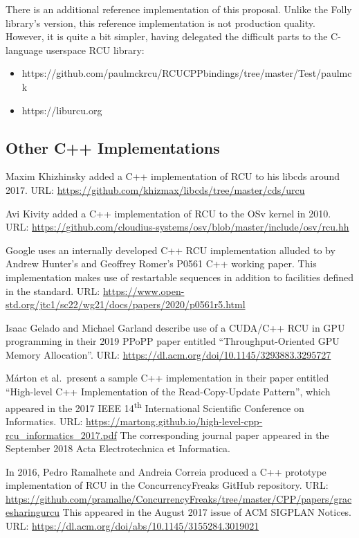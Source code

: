 There is an additional reference implementation of this proposal.
Unlike the Folly library's version, this reference implementation is
not production quality.
However, it is quite a bit simpler, having delegated the difficult parts
to the C-language userspace RCU library:

\begin{itemize}
\item	https://github.com/paulmckrcu/RCUCPPbindings/tree/master/Test/paulmck
\item	https://liburcu.org
\end{itemize}

\subsection{Other C++ Implementations}
\label{sec:Other C++ Implementations}

Maxim Khizhinsky added a C++ implementation of RCU to his libcds
around 2017.
URL: \url{https://github.com/khizmax/libcds/tree/master/cds/urcu}

Avi Kivity added a C++ implementation of RCU to the OSv kernel in
2010.
URL: \url{https://github.com/cloudius-systems/osv/blob/master/include/osv/rcu.hh}

Google uses an internally developed C++ RCU implementation alluded to by
Andrew Hunter's and Geoffrey Romer's P0561 C++ working paper.
This implementation makes use of restartable sequences in addition to
facilities defined in the standard.
URL: \url{https://www.open-std.org/jtc1/sc22/wg21/docs/papers/2020/p0561r5.html}

Isaac Gelado and Michael Garland describe use of a CUDA/C++ RCU in GPU
programming in their 2019 PPoPP paper entitled ``Throughput-Oriented
GPU Memory Allocation''.
URL: \url{https://dl.acm.org/doi/10.1145/3293883.3295727}

M\'arton et al.~present a sample C++ implementation in their paper
entitled ``High-level C++ Implementation of the Read-Copy-Update
Pattern'', which appeared in the 2017 IEEE 14\textsuperscript{th}
International Scientific Conference on Informatics.
URL: \url{https://martong.github.io/high-level-cpp-rcu_informatics_2017.pdf}
The corresponding journal paper appeared in the September 2018 Acta
Electrotechnica et Informatica.

In 2016, Pedro Ramalhete and Andreia Correia produced a C++ prototype
implementation of RCU in the ConcurrencyFreaks GitHub repository.
URL: \url{https://github.com/pramalhe/ConcurrencyFreaks/tree/master/CPP/papers/gracesharingurcu}
This appeared in the August 2017 issue of ACM SIGPLAN Notices.
URL: \url{https://dl.acm.org/doi/abs/10.1145/3155284.3019021}

